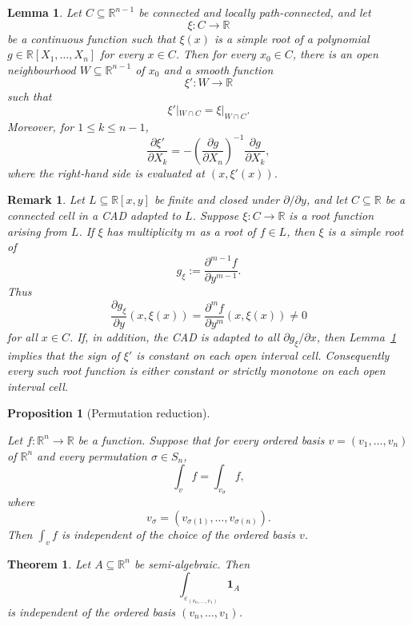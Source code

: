 \documentclass[10pt,a4paper]{amsart}
\newtheorem{proposition}{Proposition}
\newtheorem{lemma}{Lemma}
\newtheorem{remark}{Remark}
\newtheorem{theorem}{Theorem}
\begin{document}
\begin{lemma}
\label{lem:local-extension-root-function}
Let \(C\subseteq \mathbb{R}^{n-1}\) be connected and locally path-connected,
and let
\[
  \xi:C\longrightarrow \mathbb{R}
\]
be a continuous function such that \(\xi(x)\) is a simple root of a polynomial
\(g\in \mathbb{R}[X_1,\ldots,X_n]\) for every \(x\in C\).  Then for every
\(x_0\in C\), there is an open neighbourhood \(W\subseteq\mathbb{R}^{n-1}\) of
\(x_0\) and a smooth function
\[
  \xi':W\longrightarrow \mathbb{R}
\]
such that
\[
  \xi'|_{W\cap C}=\xi|_{W\cap C}.
\]
Moreover, for \(1\leq k\leq n-1\),
\[
  \frac{\partial \xi'}{\partial X_k}
  =
  -
  \left(
    \frac{\partial g}{\partial X_n}
  \right)^{-1}
  \frac{\partial g}{\partial X_k},
\]
where the right-hand side is evaluated at \((x,\xi'(x))\).
\end{lemma}

\begin{remark}
\label{rem:monotone-root-functions}
Let \(L\subseteq \mathbb{R}[x,y]\) be finite and closed under
\(\partial/\partial y\), and let \(C\subseteq\mathbb{R}\) be a connected cell in
a CAD adapted to \(L\).  Suppose \(\xi:C\to\mathbb{R}\) is a root function
arising from \(L\).  If \(\xi\) has multiplicity \(m\) as a root of
\(f\in L\), then \(\xi\) is a simple root of
\[
  g_\xi
  :=
  \frac{\partial^{m-1}f}{\partial y^{m-1}}.
\]
Thus
\[
  \frac{\partial g_\xi}{\partial y}(x,\xi(x))
  =
  \frac{\partial^m f}{\partial y^m}(x,\xi(x))
  \neq 0
\]
for all \(x\in C\).  If, in addition, the CAD is adapted to all
\(\partial g_\xi/\partial x\), then Lemma~\ref{lem:local-extension-root-function}
implies that the sign of \(\xi'\) is constant on each open interval cell.
Consequently every such root function is either constant or strictly monotone
on each open interval cell.
\end{remark}

\begin{proposition}[Permutation reduction]
\label{prop:permutation-reduction}

Let $f:\mathbb R^n\to\mathbb R$ be a function. Suppose that for every ordered basis
$v=(v_1,\ldots,v_n)$ of $\mathbb R^n$ and every permutation
$\sigma\in S_n$,
\[
\int_{v}f=\int_{v_\sigma}f,
\]
where
\[
v_\sigma=(v_{\sigma(1)},\ldots,v_{\sigma(n)}).
\]
Then $\int_{v}f$ is independent of the choice of the ordered basis $v$.

\end{proposition}

\begin{theorem}
\label{thm:basis-independence-schanuel-euler}
Let \(A\subseteq\mathbb{R}^n\) be semi-algebraic.  Then
\[
  \int_{\varepsilon_{(v_n,\ldots,v_1)}} \mathbf{1}_A
\]
is independent of the ordered basis \((v_n,\ldots,v_1)\).
\end{theorem}
\end{document}
